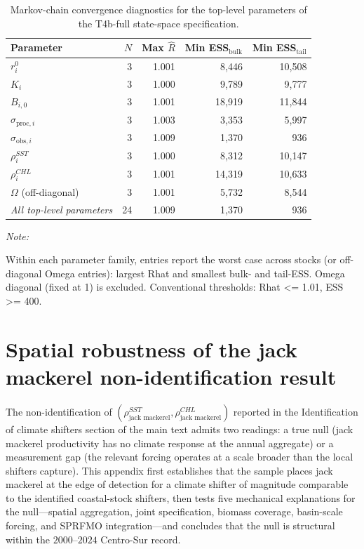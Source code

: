 \documentclass[
  11pt,
]{article}
\begin{document}
\begin{table}[!h]
\centering
\caption{\label{tab:convergence-table}Markov-chain convergence diagnostics for the top-level parameters of the T4b-full state-space specification. \label{tab:convergence}}
\centering
\fontsize{10}{12}\selectfont
\begin{threeparttable}
\begin{tabular}[t]{lrrrr}
\toprule
Parameter & $N$ & Max $\widehat{R}$ & Min ESS$_{\text{bulk}}$ & Min ESS$_{\text{tail}}$\\
\midrule
$r_i^{0}$ & 3 & 1.001 & 8,446 & 10,508\\
$K_i$ & 3 & 1.000 & 9,789 & 9,777\\
$B_{i,0}$ & 3 & 1.001 & 18,919 & 11,844\\
$\sigma_{\text{proc},i}$ & 3 & 1.003 & 3,353 & 5,997\\
$\sigma_{\text{obs},i}$ & 3 & 1.009 & 1,370 & 936\\
\addlinespace
$\rho_i^{SST}$ & 3 & 1.000 & 8,312 & 10,147\\
$\rho_i^{CHL}$ & 3 & 1.001 & 14,319 & 10,633\\
$\Omega$ (off-diagonal) & 3 & 1.001 & 5,732 & 8,544\\
\textit{All top-level parameters} & 24 & 1.009 & 1,370 & 936\\
\bottomrule
\end{tabular}
\begin{tablenotes}
\item \textit{Note:} 
\item Within each parameter family, entries report the worst case across stocks (or off-diagonal Omega entries): largest Rhat and smallest bulk- and tail-ESS. Omega diagonal (fixed at 1) is excluded. Conventional thresholds: Rhat <= 1.01, ESS >= 400.
\end{tablenotes}
\end{threeparttable}
\end{table}

\section{Spatial robustness of the jack mackerel non-identification result}\label{appendix-spatial}

The non-identification of \((\rho_{\text{jack mackerel}}^{SST}, \rho_{\text{jack mackerel}}^{CHL})\)
reported in the Identification of climate shifters section of the
main text admits two readings: a true null (jack mackerel productivity has no
climate response at the annual aggregate) or a measurement gap (the
relevant forcing operates at a scale broader than the local shifters
capture). This appendix first establishes that the sample places jack mackerel at the
edge of detection for a climate shifter of magnitude comparable to the
identified coastal-stock shifters, then tests
five mechanical explanations for the null---spatial aggregation,
joint specification, biomass coverage, basin-scale forcing, and
SPRFMO integration---and concludes that the null is structural within
the \(2000\)--\(2024\) Centro-Sur record.
\end{document}
